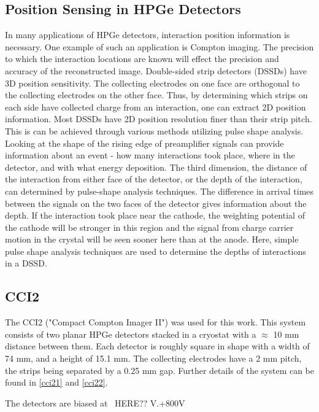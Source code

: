 \subsection{Position Sensing in HPGe Detectors}

In many applications of HPGe detectors, interaction position information is necessary. One example of such an application is Compton imaging. The precision to which the interaction locations are known will effect the precision and accuracy of the reconstructed image.
Double-sided strip detectors (DSSDs) have 3D position sensitivity. The collecting electrodes on one face are orthogonal to the collecting electrodes on the other face. Thus, by determining which strips on each side have collected charge from an interaction, one can extract 2D position information. Most DSSDs have 2D position resolution finer than their strip pitch. This is can be achieved through various methods utilizing pulse shape analysis. Looking at the shape of the rising edge of preamplifier signals can provide information about an event - how many interactions took place, where in the detector, and with what energy deposition. 
The third dimension, the distance of the interaction from either face of the detector, or the depth of the interaction, can determined by pulse-shape analysis techniques. The difference in arrival times between the signals on the two faces of the detector gives information about the depth. If the interaction took place near the cathode, the weighting potential of the cathode will be stronger in this region and the signal from charge carrier motion in the crystal will be seen sooner here than at the anode. Here, simple pulse shape analysis techniques are used to determine the depths of interactions in a DSSD.

\subsection{CCI2}

The CCI2 ("Compact Compton Imager II") was used for this work. This system consists of two planar HPGe detectors stacked in a cryostat with a $\approx$ 10 mm distance between them. Each detector is roughly square in shape with a width of 74 mm, and a height of 15.1 mm. The collecting electrodes have a 2 mm pitch, the strips being separated by a 0.25 mm gap. Further details of the system can be found in \ref{cci21} and \ref{cci22}.

The detectors are biased at ~HERE?? V.+800V